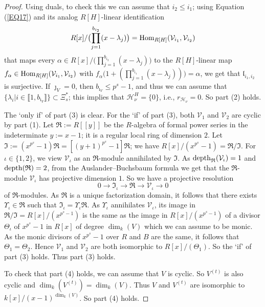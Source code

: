 \documentclass[11pt]{amsart}
\def\depth{\textup{depth}}
\def\Hom{\textup{Hom}}
\begin{document}
\begin{proof}
Using duals, to check this we can assume that $i_2\le i_1$; using Equation (\ref{EQ17}) and its analog $R[H]$-linear identification
$$R[x]/\bigl(\prod_{j=1}^{b_{i_2}} (x-\lambda_j)\bigr)=\Hom_{R[H]}(\mathcal V_{i_1},\mathcal V_{i_2})$$ 
that maps every $\alpha\in R[x]/\bigl(\prod_{j=1}^{b_{i_2}} (x-\lambda_j)\bigr)$ to the $R[H]$-linear map $\break f_{\alpha}\in\Hom_{R[H]}(\mathcal V_{i_1},\mathcal V_{i_2})$ with $f_{\alpha}\bigl(1+(\prod_{j=1}^{b_{i_1}} (x-\lambda_j))\bigr)=\alpha$, we get that $\mathfrak l_{i_1,i_2}$ is surjective. If $\jmath_V=0$, then $b_{\imath_V}\le p^s-1$, and thus we can assume that $\{\lambda_i|i\in\llbracket1,b_{\imath_V}\rrbracket\}\subset\Xi_s^{\ast}$; this implies that $\mathcal H_{\nu}^H=\{0\}$, i.e., $r_{\mathcal H_{\nu}}=0$. So part (2) holds.

The `only if' of part (3) is clear. For the `if' of part (3), both $\mathcal V_1$ and $\mathcal V_2$ are cyclic by part (1). Let $\mathfrak R:=R[[y]]$ be the $R$-algebra of formal power series in the indeterminate $y:=x-1$; it is a regular local ring of dimension $2$. Let $\mathfrak I:=(x^{p^s}-1)\mathfrak R=[(y+1)^{p^s}-1]\mathfrak R$; we have $R[x]/(x^{p^s}-1)=\mathfrak R/\mathfrak I$. For $\iota\in\{1,2\}$, we view $\mathcal V_{\iota}$ as an $\mathfrak R$-module annihilated by $\mathfrak I$. As $\depth_{\mathfrak R}(\mathcal V_{\iota})=1$ and $\depth(\mathfrak R)=2$, from the Auslander--Buchsbaum formula we get that the $\mathfrak R$-module $\mathcal V_{\iota}$ has projective dimension $1$. So we have a projective resolution 
$$0\rightarrow\mathfrak I_{\iota}\rightarrow\mathfrak R\rightarrow \mathcal V_{\iota}\rightarrow 0$$
of $\mathfrak R$-modules. As $\mathfrak R$ is a unique factorization domain, it follows that there exists $\Upsilon_{\iota}\in\mathfrak R$ such that $\mathfrak I_{\iota}=\Upsilon_{\iota}\mathfrak R$. As $\Upsilon_{\iota}$ annihilates $\mathcal V_{\iota}$, its image in $\mathfrak R/\mathfrak I=R[x]/(x^{p^s-1})$ is the same as the image in $R[x]/(x^{p^s-1})$ of a divisor $\Theta_{\iota}$ of $x^{p^s}-1$ in $R[x]$ of degree $\dim_k(V)$ which we can assume to be monic. As the monic divisors of $x^{p^s}-1$ over $R$ and $B$ are the same, it follows that $\Theta_1=\Theta_2$. Hence $\mathcal V_1$ and $\mathcal V_2$ are both isomorphic to $R[x]/(\Theta_1)$. So the `if' of part (3) holds. Thus part (3) holds.

To check that part (4) holds, we can assume that $V$ is cyclic. So $V^{(t)}$ is also cyclic and $\dim_k(V^{(t)})=\dim_k(V)$. Thus $V$ and $V^{(t)}$ are isomorphic to $k[x]/(x-1)^{\dim_k(V)}$. So part (4) holds.


\end{proof}
\end{document}
